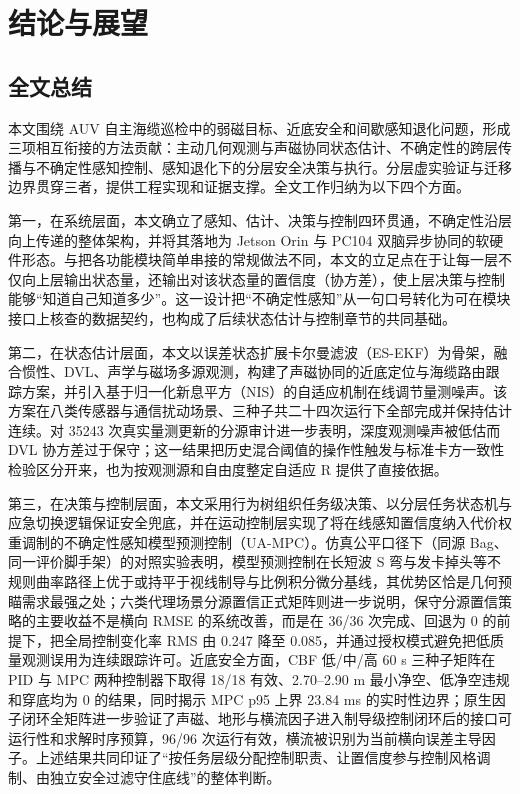 
\chapter{结论与展望}

\section{全文总结}\label{sec:ch06-6-1}

本文围绕 AUV 自主海缆巡检中的弱磁目标、近底安全和间歇感知退化问题，形成三项相互衔接的方法贡献：主动几何观测与声磁协同状态估计、不确定性的跨层传播与不确定性感知控制、感知退化下的分层安全决策与执行。分层虚实验证与迁移边界贯穿三者，提供工程实现和证据支撑。全文工作归纳为以下四个方面。

第一，在系统层面，本文确立了感知、估计、决策与控制四环贯通，不确定性沿层向上传递的整体架构，并将其落地为 Jetson Orin 与 PC104 双脑异步协同的软硬件形态。与把各功能模块简单串接的常规做法不同，本文的立足点在于让每一层不仅向上层输出状态量，还输出对该状态量的置信度（协方差），使上层决策与控制能够``知道自己知道多少''。这一设计把``不确定性感知''从一句口号转化为可在模块接口上核查的数据契约，也构成了后续状态估计与控制章节的共同基础。

第二，在状态估计层面，本文以误差状态扩展卡尔曼滤波（ES-EKF）为骨架，融合惯性、DVL、声学与磁场多源观测，构建了声磁协同的近底定位与海缆路由跟踪方案，并引入基于归一化新息平方（NIS）的自适应机制在线调节量测噪声。该方案在八类传感器与通信扰动场景、三种子共二十四次运行下全部完成并保持估计连续。对 35243 次真实量测更新的分源审计进一步表明，深度观测噪声被低估而 DVL 协方差过于保守；这一结果把历史混合阈值的操作性触发与标准卡方一致性检验区分开来，也为按观测源和自由度整定自适应 R 提供了直接依据。

第三，在决策与控制层面，本文采用行为树组织任务级决策、以分层任务状态机与应急切换逻辑保证安全兜底，并在运动控制层实现了将在线感知置信度纳入代价权重调制的不确定性感知模型预测控制（UA-MPC）。仿真公平口径下（同源 Bag、同一评价脚手架）的对照实验表明，模型预测控制在长短波 S 弯与发卡掉头等不规则曲率路径上优于或持平于视线制导与比例积分微分基线，其优势区恰是几何预瞄需求最强之处；六类代理场景分源置信正式矩阵则进一步说明，保守分源置信策略的主要收益不是横向 RMSE 的系统改善，而是在 36/36 次完成、回退为 0 的前提下，把全局控制变化率 RMS 由 0.247 降至 0.085，并通过授权模式避免把低质量观测误用为连续跟踪许可。近底安全方面，CBF 低/中/高 60 s 三种子矩阵在 PID 与 MPC 两种控制器下取得 18/18 有效、2.70--2.90 m 最小净空、低净空违规和穿底均为 0 的结果，同时揭示 MPC p95 上界 23.84 ms 的实时性边界；原生因子闭环全矩阵进一步验证了声磁、地形与横流因子进入制导级控制闭环后的接口可运行性和求解时序预算，96/96 次运行有效，横流被识别为当前横向误差主导因子。上述结果共同印证了``按任务层级分配控制职责、让置信度参与控制风格调制、由独立安全过滤守住底线''的整体判断。

